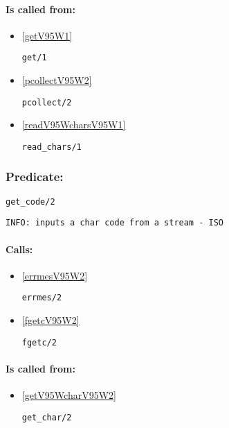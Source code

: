 \paragraph{Is called from:} 
\begin{itemize}
\item \ref{getV95W1} 
\begin{verbatim}
get/1
\end{verbatim}

\item \ref{pcollectV95W2} 
\begin{verbatim}
pcollect/2
\end{verbatim}

\item \ref{readV95WcharsV95W1} 
\begin{verbatim}
read_chars/1
\end{verbatim}

\end{itemize}

\subsubsection{Predicate:} \label{getV95WcodeV95W2}

\begin{verbatim}
get_code/2
\end{verbatim}

{\small \begin{verbatim}
INFO: inputs a char code from a stream - ISO

\end{verbatim}}
\paragraph{Calls:} 
\begin{itemize}
\item \ref{errmesV95W2} 
\begin{verbatim}
errmes/2
\end{verbatim}

\item \ref{fgetcV95W2} 
\begin{verbatim}
fgetc/2
\end{verbatim}

\end{itemize}
\paragraph{Is called from:} 
\begin{itemize}
\item \ref{getV95WcharV95W2} 
\begin{verbatim}
get_char/2
\end{verbatim}

\end{itemize}

